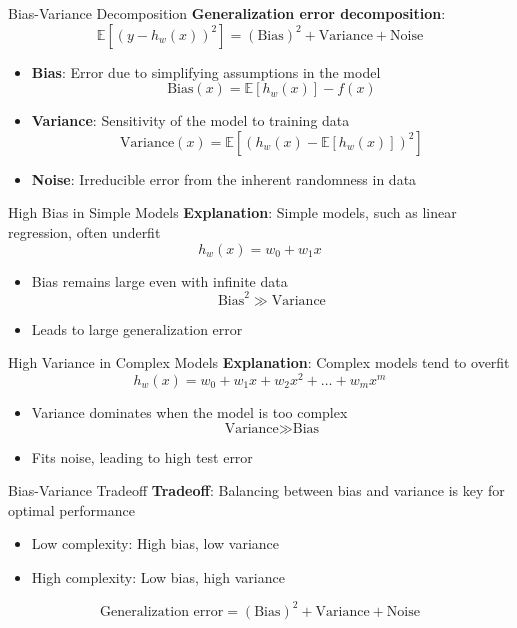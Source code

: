 \documentclass[serif, aspectratio=169]{beamer}
\begin{document}
\begin{frame}{Bias-Variance Decomposition}
    \textbf{Generalization error decomposition}:
    \[
    \mathbb{E}[(y - h_w(x))^2] = (\text{Bias})^2 + \text{Variance} + \text{Noise}
    \]
    \begin{itemize}
        \item \textbf{Bias}: Error due to simplifying assumptions in the model
        \[
        \text{Bias}(x) = \mathbb{E}[h_w(x)] - f(x)
        \]
        \item \textbf{Variance}: Sensitivity of the model to training data
        \[
        \text{Variance}(x) = \mathbb{E}[(h_w(x) - \mathbb{E}[h_w(x)])^2]
        \]
        \item \textbf{Noise}: Irreducible error from the inherent randomness in data
    \end{itemize}
\end{frame}

\begin{frame}{High Bias in Simple Models}
    \textbf{Explanation}: Simple models, such as linear regression, often underfit
    \[
    h_w(x) = w_0 + w_1 x
    \]
    \begin{itemize}
        \item Bias remains large even with infinite data
        \[
        \text{Bias}^2 \gg \text{Variance}
        \]
        \item Leads to large generalization error
    \end{itemize}
\end{frame}

\begin{frame}{High Variance in Complex Models}
    \textbf{Explanation}: Complex models tend to overfit
    \[
    h_w(x) = w_0 + w_1 x + w_2 x^2 + \dots + w_m x^m
    \]
    \begin{itemize}
        \item Variance dominates when the model is too complex
        \[
        \text{Variance} \gg \text{Bias}
        \]
        \item Fits noise, leading to high test error
    \end{itemize}
\end{frame}

\begin{frame}{Bias-Variance Tradeoff}
    \textbf{Tradeoff}: Balancing between bias and variance is key for optimal performance
    \begin{itemize}
        \item Low complexity: High bias, low variance
        \item High complexity: Low bias, high variance
    \end{itemize}
    \[
    \text{Generalization error} = (\text{Bias})^2 + \text{Variance} + \text{Noise}
    \]
\end{frame}
\end{document}
